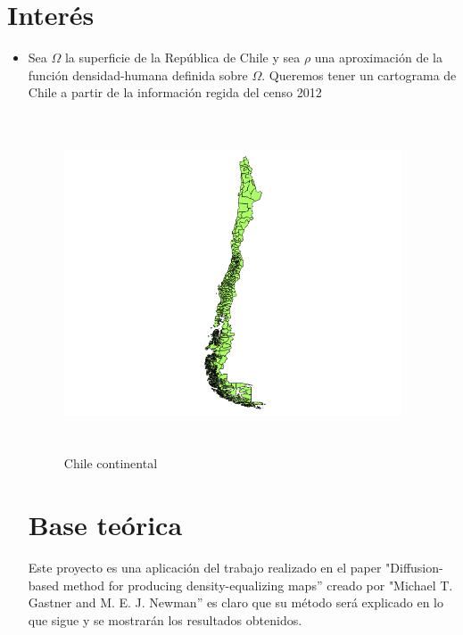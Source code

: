 \documentclass[20pt]{report}
\begin{document}
\section{ Inter\'es}
\begin{itemize}
\item Sea $\Omega$ la superficie de la Rep\'ublica de Chile y sea $\rho$ una aproximaci\'on de la funci\'on densidad-humana definida sobre $\Omega$. Queremos tener un cartograma de Chile a partir de la informaci\'on regida del censo 2012
\\
\begin{figure}[H]
\begin{center}
\includegraphics[width=10cm, height=10cm]{Chile.png}
\vspace{-0.5cm} %
\caption{Chile continental}
\label{Label para referencia}
\end{center}
\end{figure}



\pagebreak
\label{cap.introduccion}\section{Base te\'orica}

Este proyecto es una aplicaci\'on del trabajo realizado en el paper "Diffusion-based method for producing
density-equalizing maps'' creado por   "Michael T. Gastner and M. E. J. Newman''  es claro que su m\'etodo ser\'a explicado en lo que sigue y se mostrar\'an los resultados obtenidos. \\\\


\end{itemize}
\end{document}
